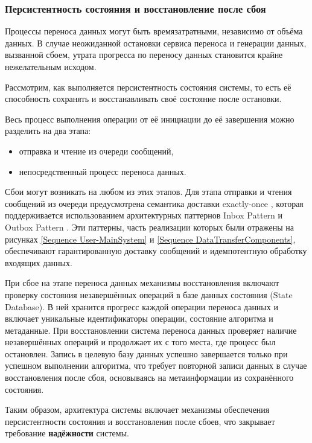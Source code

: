 \subsubsection{Персистентность состояния и восстановление после сбоя}

Процессы переноса данных могут быть времязатратными, независимо от объёма данных. В случае неожиданной остановки сервиса переноса и генерации данных, вызванной сбоем, утрата прогресса по переносу данных становится крайне нежелательным исходом.

Рассмотрим, как выполняется персистентность состояния системы, то есть её способность сохранять и восстанавливать своё состояние после остановки.

Весь процесс выполнения операции от её инициации до её завершения можно разделить на два этапа:
\begin{itemize}
  \item отправка и чтение из очереди сообщений,
  \item непосредственный процесс переноса данных.
\end{itemize}

Сбои могут возникать на любом из этих этапов. Для этапа отправки и чтения сообщений из очереди предусмотрена семантика доставки exactly-once \cite{delivery-guarantees}, которая поддерживается использованием архитектурных паттернов Inbox Pattern и Outbox Pattern \cite{outbox-and-inbox}. Эти паттерны, часть реализации которых были отражены на рисунках \ref{Sequence User-MainSystem} и \ref{Sequence DataTransferComponents}, обеспечивают гарантированную доставку сообщений и идемпотентную обработку входящих данных.

При сбое на этапе переноса данных механизмы восстановления включают проверку состояния незавершённых операций в базе данных состояния (State Database). В ней хранится прогресс каждой операции переноса данных и включает уникальные идентификаторы операции, состояние алгоритма и метаданные. При восстановлении система переноса данных проверяет наличие незавершённых операций и продолжает их с того места, где процесс был остановлен. Запись в целевую базу данных успешно завершается только при успешном выполнении алгоритма, что требует повторной записи данных в случае восстановления после сбоя, основываясь на метаинформации из сохранённого состояния.

Таким образом, архитектура системы включает механизмы обеспечения персистентности состояния и восстановления после сбоев, что закрывает требование \textbf{надёжности} системы.

